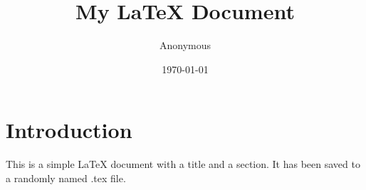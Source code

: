 \documentclass{article}
\title{My LaTeX Document}
\author{Anonymous}
\date{\today}
\begin{document}
\maketitle

\section{Introduction}
This is a simple LaTeX document with a title and a section. It has been saved to a randomly named .tex file.
\end{document}

